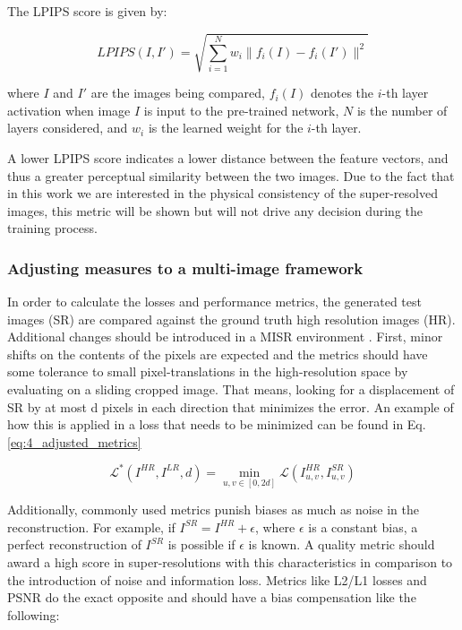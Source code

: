         The LPIPS score is given by:
        
        \begin{equation}
        LPIPS(I, I') = \sqrt{\sum_{i=1}^{N} w_i\|f_i(I)-f_i(I')\|^2}
        \end{equation}
        
        where $I$ and $I'$ are the images being compared, $f_i(I)$ denotes the $i$-th layer activation when image $I$ is input to the pre-trained network, $N$ is the number of layers considered, and $w_i$ is the learned weight for the $i$-th layer.
        
        A lower LPIPS score indicates a lower distance between the feature vectors, and thus a greater perceptual similarity between the two images. 
        Due to the fact that in this work we are interested in the physical consistency of the super-resolved images, 
        this metric will be shown but will not drive any decision during the training process.
        

        \subsubsection{Adjusting measures to a multi-image framework}
    
            In order to calculate the losses and performance metrics, the generated test images (SR) are compared against the ground truth high resolution images (HR).
            Additional changes should be introduced in a MISR environment \cite{martens2019superresolution}.
            First, minor shifts on the contents of the pixels are expected and the metrics should have some tolerance to small pixel-translations in the high-resolution space by evaluating on a sliding cropped image. 
            That means, looking for a displacement of SR by at most d pixels in each direction that minimizes the error. 
            An example of how this is applied in a loss that needs to be minimized can be found in Eq. \ref{eq:4_adjusted_metrics}
    
            \begin{equation}
               \mathcal{L}^* ( I^{HR}, I^{LR}, d) = \min_{u,v \in [0,2d]} \mathcal{L} ( I^{HR}_{u,v}, I^{SR}_{u,v})
            \label{eq:4_adjusted_metrics}
            \end{equation}
    
            Additionally, commonly used metrics punish biases as much as noise in the reconstruction.
            For example, if $I^{SR} = I^{HR} + \epsilon$, where $\epsilon$ is a constant bias, a perfect reconstruction of $I^{SR}$ is possible if $\epsilon$ is known. 
            A quality metric should award a high score in super-resolutions with this characteristics in comparison to the introduction of noise and information loss. Metrics like L2/L1 losses and PSNR do the exact opposite and should have a bias compensation like the following: 
    
